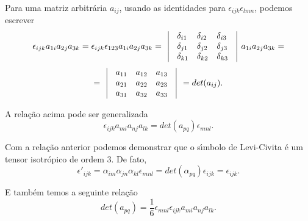 Para uma matriz arbitr\'aria $a_{ij}$, usando as identidades  para
$\epsilon_{ijk}\epsilon_{lmn}$, podemos escrever
\[\epsilon_{ijk}a_{1i}a_{2j}a_{3k}=\epsilon_{ijk}\epsilon_{123}a_{1i}a_{2j}a_{3k}=
\begin{array}{lllll}
                \vline&\delta_{i1} & \delta_{i2} & \delta_{i3}&\vline \\
                \vline&\delta_{j1} & \delta_{j2} & \delta_{j3}&\vline \\
                \vline&\delta_{k1} & \delta_{k2} & \delta_{k3}& \vline\\
\end{array}a_{1i}a_{2j}a_{3k}=\] \[ =\begin{array}{lllll}
                \vline&a_{11} & a_{12} & a_{13}& \vline\\
                \vline&a_{21} & a_{22} & a_{23}&\vline \\
                \vline&a_{31} & a_{32} & a_{33}&\vline \\
\end{array}=det(a_{ij}).\]

A rela\c{c}\~ao acima pode ser generalizada
\[\epsilon_{ijk}a_{mi}a_{nj}a_{lk}=det(a_{pq})\epsilon_{mnl}.\]

Com a rela\c{c}\~ao anterior podemos demonstrar que  o s\'\i mbolo
de Levi-Civita \'e um tensor isotr\'opico de ordem $3$. De fato,
\[\epsilon'_{ijk}=\alpha_{im}\alpha_{jn}\alpha_{kl}\epsilon_{mnl}=det(\alpha_{pq})\epsilon_{ijk}=\epsilon_{ijk}.\]

E tamb\'em temos a seguinte rela\c{c}\~ao
\[det(a_{pq})=\frac{1}{6}\epsilon_{mnl}\epsilon_{ijk}a_{mi}a_{nj}a_{lk}.\]




